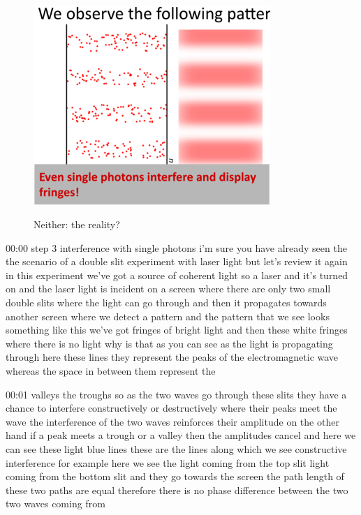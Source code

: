 \begin{figure}[H]
   \centering
    \includegraphics[width=0.8\textwidth]{lesson6/block_neither_reality.pdf}
    \label{fig: 1}
    
        \caption{Neither: the reality?}
    
\end{figure}


00:00
step 3 interference with single photons i'm sure you have already seen the the
scenario of a double slit experiment with laser light but let's review it again
in this experiment we've got a source of coherent light so a laser
and it's turned on and the laser light is incident
on a screen where there are only two small double slits where the light
can go through and then it propagates towards another
screen where we detect a pattern and the pattern that we see looks
something like this we've got fringes of bright light and then these white
fringes where there is no light why is that as you can see as the light is
propagating through here these lines they represent the peaks
of the electromagnetic wave whereas the space in between them represent the

00:01
valleys the troughs so as the two waves go through
these slits they have a chance to interfere constructively or destructively
where their peaks meet the wave the interference of the two waves reinforces
their amplitude on the other hand if a peak meets a trough or a valley then the
amplitudes cancel and here we can see these light blue lines
these are the lines along which we see constructive interference
for example here we see the light coming from the top slit
light coming from the bottom slit and they go towards the screen
the path length of these two paths are equal therefore
there is no phase difference between the two two waves coming from

